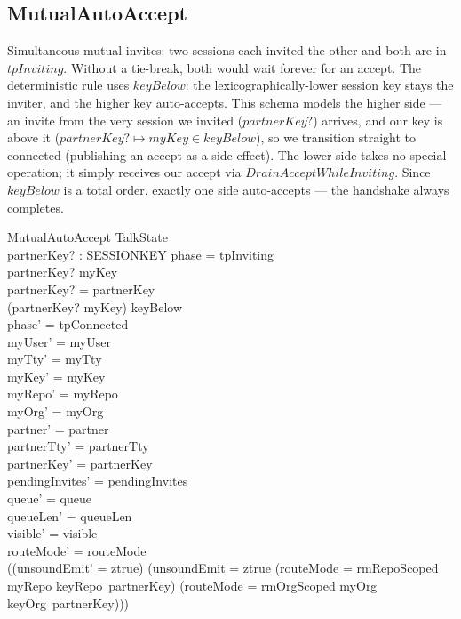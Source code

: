 \documentclass[a4paper,10pt,fleqn]{article}
\begin{document}
\subsection{MutualAutoAccept}

Simultaneous mutual invites: two sessions each invited the other and
both are in $tpInviting$.  Without a tie-break, both would wait forever
for an accept.  The deterministic rule uses $keyBelow$: the
lexicographically-lower session key stays the inviter, and the higher
key auto-accepts.  This schema models the higher side --- an invite
from the very session we invited ($partnerKey?$) arrives, and our key
is above it ($partnerKey? \mapsto myKey \in keyBelow$), so we transition
straight to connected (publishing an accept as a side effect).  The
lower side takes no special operation; it simply receives our accept
via $DrainAcceptWhileInviting$.  Since $keyBelow$ is a total order,
exactly one side auto-accepts --- the handshake always completes.

\begin{schema}{MutualAutoAccept}
  \Delta TalkState \\
  partnerKey? : SESSIONKEY
\where
  phase = tpInviting \\
  partnerKey? \neq myKey \\
  partnerKey? = partnerKey \\
  (partnerKey? \mapsto myKey) \in keyBelow \\
  phase' = tpConnected \\
  myUser' = myUser \\
  myTty' = myTty \\
  myKey' = myKey \\
  myRepo' = myRepo \\
  myOrg' = myOrg \\
  partner' = partner \\
  partnerTty' = partnerTty \\
  partnerKey' = partnerKey \\
  pendingInvites' = pendingInvites \\
  queue' = queue \\
  queueLen' = queueLen \\
  visible' = visible \\
  routeMode' = routeMode \\
  ((unsoundEmit' = ztrue) \iff
    (unsoundEmit = ztrue \lor
      (routeMode = rmRepoScoped \land myRepo \neq keyRepo~partnerKey) \lor
      (routeMode = rmOrgScoped \land myOrg \neq keyOrg~partnerKey)))
\end{schema}
\end{document}
